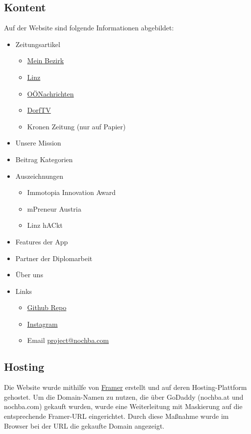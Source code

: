 \subsection{Kontent}
Auf der Website sind folgende Informationen abgebildet:
\begin{itemize}
  \item Zeitungsartikel
        \begin{itemize}
          \item \href{https://www.meinbezirk.at/linz/c-wirtschaft/linzer-nachwuchs-hacker-beweisen-sich-in-nordmazedonien_a5654095}{Mein Bezirk}
          \item \href{https://www.linz.at/medienservice/2022/202203_114704.php}{Linz}
          \item \href{https://www.nachrichten.at/oberoesterreich/linz/von-linz-nach-nordmazedonien;art66,3728292}{OÖNachrichten}
          \item \href{https://jugendhackt.org/video/nochba/}{DorfTV}
          \item Kronen Zeitung (nur auf Papier)
        \end{itemize}
  \item Unsere Mission
  \item Beitrag Kategorien
  \item Auszeichnungen
        \begin{itemize}
          \item Immotopia Innovation Award
          \item mPreneur Austria
          \item Linz hACkt
        \end{itemize}
  \item Features der App
  \item Partner der Diplomarbeit
  \item Über uns
  \item Links
        \begin{itemize}
          \item \href{https://github.com/Martin-Hausleitner/Nochba}{Github Repo}
          \item \href{https://www.instagram.com/nochba.at/}{Instagram}
          \item Email \href{mailto:project@nochba.com}{project@nochba.com}
        \end{itemize}
\end{itemize}


\subsection{Hosting}
Die Website wurde mithilfe von \href{https://framer.com}{Framer} erstellt und auf deren
Hosting-Plattform gehostet. Um die Domain-Namen zu nutzen,
die über GoDaddy (nochba.at und nochba.com) gekauft wurden, wurde eine Weiterleitung
mit Maskierung auf die entsprechende Framer-URL
eingerichtet. Durch diese Maßnahme wurde im Browser bei der
URL die gekaufte Domain angezeigt.


